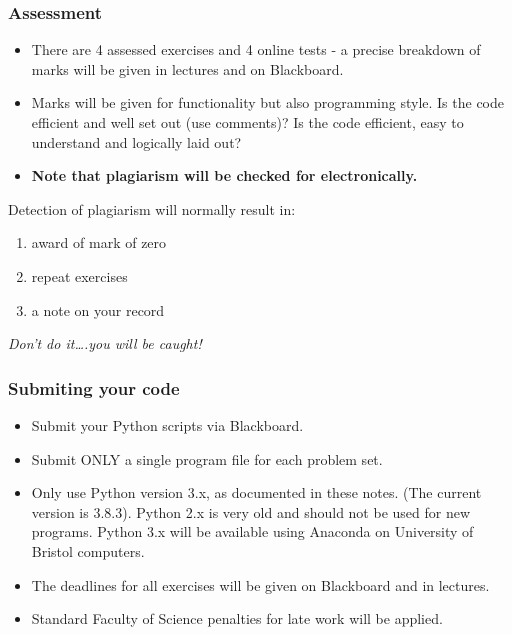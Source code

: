 \documentclass[10pt]{article}
\providecommand{\tightlist}{%
      \setlength{\itemsep}{0pt}\setlength{\parskip}{0pt}}
\begin{document}
    \hypertarget{assessment}{%
\subsubsection{Assessment}\label{assessment}}

\begin{itemize}
\tightlist
\item
  There are 4 assessed exercises and 4 online tests - a precise
  breakdown of marks will be given in lectures and on Blackboard.
\item
  Marks will be given for functionality but also programming style. Is
  the code efficient and well set out (use comments)? Is the code
  efficient, easy to understand and logically laid out?
\item
  \textbf{Note that plagiarism will be checked for electronically.}
\end{itemize}

Detection of plagiarism will normally result in:

\begin{enumerate}
\def\labelenumi{\arabic{enumi}.}
\tightlist
\item
  award of mark of zero
\item
  repeat exercises
\item
  a note on your record
\end{enumerate}

\emph{Don't do it\ldots{}.you will be caught!}

    \hypertarget{submiting-your-code}{%
\subsubsection{Submiting your code}\label{submiting-your-code}}

\begin{itemize}
\tightlist
\item
  Submit your Python scripts via Blackboard.
\item
  Submit ONLY a single program file for each problem set.
\item
  Only use Python version 3.x, as documented in these notes. (The
  current version is 3.8.3). Python 2.x is very old and should not be
  used for new programs. Python 3.x will be available using Anaconda on
  University of Bristol computers.
\item
  The deadlines for all exercises will be given on Blackboard and in
  lectures.
\item
  Standard Faculty of Science penalties for late work will be applied.
\end{itemize}
\end{document}
